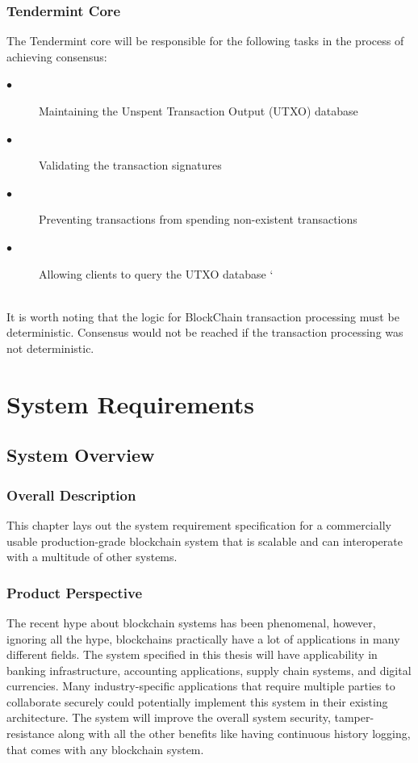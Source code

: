 \documentclass[a4paper,twoside,phd]{BYUPhys}
\begin{document}
\subsection{Tendermint Core}
The Tendermint core will be responsible for the following tasks in the process of achieving consensus\cite{}:
\begin{description}
\item[$\bullet$]Maintaining the Unspent Transaction Output (UTXO) database
\item[$\bullet$]Validating the transaction signatures
\item[$\bullet$]Preventing transactions from spending non-existent transactions
\item[$\bullet$]Allowing clients to query the UTXO database
`
\end{description}
\\
It is worth noting that the logic for BlockChain transaction processing must be deterministic. Consensus would not be reached if the transaction processing was not deterministic\cite{}. 
\label{chap:LitReview}

\chapter{System Requirements}
\label{chap:singleuser}

\section{System Overview \label{sec:Intro-ChapUserSelec}}
\subsection{Overall Description}
This chapter lays out the system requirement specification for a commercially usable production-grade blockchain system that is scalable and can interoperate with a multitude of other systems.
\subsection{Product Perspective}
The recent hype about blockchain systems has been phenomenal, however, ignoring all the hype, blockchains practically have a lot of applications in many different fields. The system specified in this thesis will have applicability in banking infrastructure, accounting applications, supply chain systems, and digital currencies. Many industry-specific applications that require multiple parties to collaborate securely could potentially implement this system in their existing architecture. The system will improve the overall system security, tamper-resistance along with all the other benefits like having continuous history logging, that comes with any blockchain system.
\end{document}
